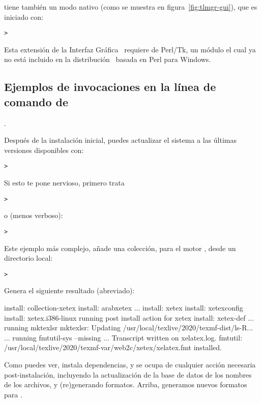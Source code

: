 \documentclass{article}
\begin{document}
 tiene también un modo nativo \GUI{}
(como se muestra en figura~\ref{fig:tlmgr-gui}), que es iniciado con:
\begin{alltt}
> 
\end{alltt}

Esta extensión de la Interfaz Gráfica \GUI\ requiere de
Perl/Tk, un módulo el cual ya no está incluido en la
distribución \TL\ basada en Perl para Windows.

\subsection{Ejemplos de invocaciones en la línea de comando de
}. 

Después de la instalación inicial, puedes actualizar el sistema a las
últimas versiones disponibles con: 
\begin{alltt}
> 
\end{alltt}
Si esto te pone nervioso, primero trata
\begin{alltt}
> 
\end{alltt}
o (menos verboso):
\begin{alltt}
> 
\end{alltt}

Este ejemplo más complejo, añade una colección, para el motor \XeTeX,
desde un directorio local:

\begin{alltt}
> 
\end{alltt}
Genera el siguiente resultado (abreviado):
\begin{fverbatim}
install: collection-xetex
install: arabxetex
...
install: xetex
install: xetexconfig
install: xetex.i386-linux
running post install action for xetex
install: xetex-def
...
running mktexlsr
mktexlsr: Updating /usr/local/texlive/2020/texmf-dist/ls-R...
...
running fmtutil-sys --missing
...
Transcript written on xelatex.log.
fmtutil: /usr/local/texlive/2020/texmf-var/web2c/xetex/xelatex.fmt installed.
\end{fverbatim}

Como puedes ver,  instala dependencias, y se ocupa de
cualquier acción necesaria post-instalación, incluyendo la
actualización de la base de datos de los nombres de los archivos, y
(re)generando formatos. Arriba, generamos nuevos formatos para \XeTeX.
\end{document}

